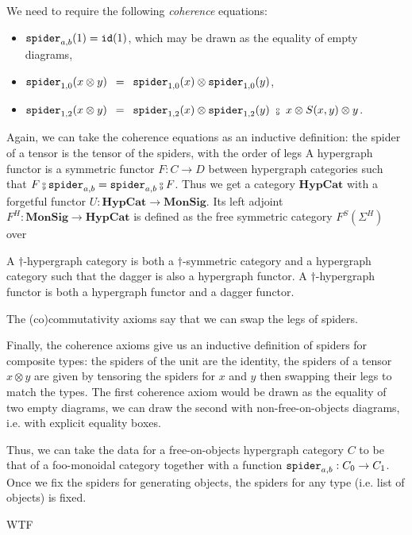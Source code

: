 We need to require the following \emph{coherence} equations:
\begin{itemize}
\item $\mathtt{spider}_{a, b}(1) = \mathtt{id}(1)$, which may be drawn as the equality of empty diagrams,
\item $\mathtt{spider}_{1, 0}(x \otimes y) \enspace = \enspace \mathtt{spider}_{1, 0}(x) \otimes \mathtt{spider}_{1, 0}(y)$,
\item $\spider_{1, 2}(x \otimes y) \s = \s \spider_{1, 2}(x) \otimes \spider_{1, 2}(y) \ \fcmp \ x \otimes S(x, y) \otimes y$.
\end{itemize}
Again, we can take the coherence equations as an inductive definition: the spider of a tensor is the tensor of the spiders, with the order of legs
A hypergraph functor is a symmetric functor $F : C \to D$ between hypergraph categories such that $F \fcmp \spider_{a, b} = \spider_{a, b} \fcmp F$.
Thus we get a category $\mathbf{HypCat}$ with a forgetful functor $U : \mathbf{HypCat} \to \mathbf{MonSig}$.
Its left adjoint $F^H : \mathbf{MonSig} \to \mathbf{HypCat}$ is defined as the free symmetric category $F^S(\Sigma^H)$ over

A $\dagger$-hypergraph category is both a $\dagger$-symmetric category and a hypergraph category such that the dagger is also a hypergraph functor.
A $\dagger$-hypergraph functor is both a hypergraph functor and a dagger functor.


The (co)commutativity axioms say that we can swap the legs of spiders.


Finally, the coherence axioms give us an inductive definition of spiders for composite types: the spiders of the unit are the identity, the spiders of a tensor $x \otimes y$ are given by tensoring the spiders for $x$ and $y$ then swapping their legs to match the types.
The first coherence axiom would be drawn as the equality of two empty diagrams, we can draw the second with non-free-on-objects diagrams, i.e. with explicit equality boxes.


Thus, we can take the data for a free-on-objects hypergraph category $C$ to be that of a foo-monoidal category together with a function $\mathtt{spider}_{a, b} : C_0 \to C_1$.
Once we fix the spiders for generating objects, the spiders for any type (i.e. list of objects) is fixed.

WTF
